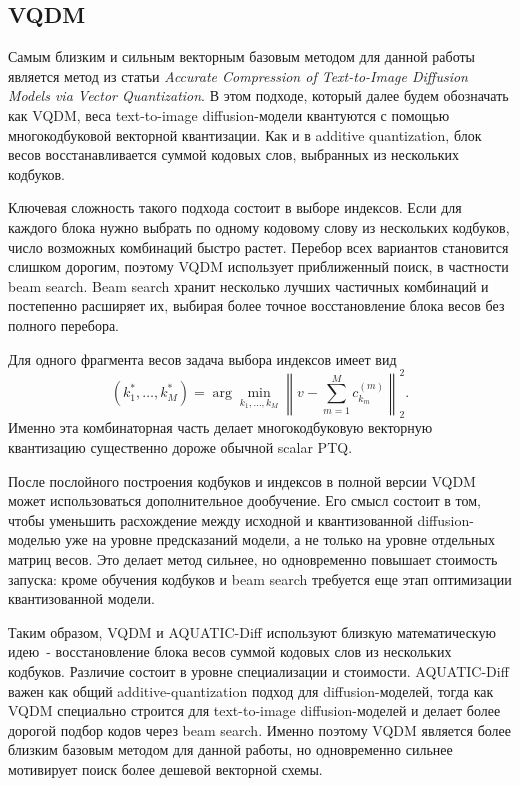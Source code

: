 \documentclass[a4paper,12pt]{article}
\begin{document}
\subsection{VQDM}

Самым близким и сильным векторным базовым методом для данной работы является метод из статьи \textit{Accurate Compression of Text-to-Image Diffusion Models via Vector Quantization}. В этом подходе, который далее будем обозначать как VQDM, веса text-to-image diffusion-модели квантуются с помощью многокодбуковой векторной квантизации. Как и в additive quantization, блок весов восстанавливается суммой кодовых слов, выбранных из нескольких кодбуков.

Ключевая сложность такого подхода состоит в выборе индексов. Если для каждого блока нужно выбрать по одному кодовому слову из нескольких кодбуков, число возможных комбинаций быстро растет. Перебор всех вариантов становится слишком дорогим, поэтому VQDM использует приближенный поиск, в частности beam search. Beam search хранит несколько лучших частичных комбинаций и постепенно расширяет их, выбирая более точное восстановление блока весов без полного перебора.

Для одного фрагмента весов задача выбора индексов имеет вид
\[
    (k_1^*, \ldots, k_M^*)
    =
    \arg\min_{k_1,\ldots,k_M}
    \left\|
        v - \sum_{m=1}^{M} c^{(m)}_{k_m}
    \right\|_2^2.
\]
Именно эта комбинаторная часть делает многокодбуковую векторную квантизацию существенно дороже обычной scalar PTQ.

После послойного построения кодбуков и индексов в полной версии VQDM может использоваться дополнительное дообучение. Его смысл состоит в том, чтобы уменьшить расхождение между исходной и квантизованной diffusion-моделью уже на уровне предсказаний модели, а не только на уровне отдельных матриц весов. Это делает метод сильнее, но одновременно повышает стоимость запуска: кроме обучения кодбуков и beam search требуется еще этап оптимизации квантизованной модели.

Таким образом, VQDM и AQUATIC-Diff используют близкую математическую идею~- восстановление блока весов суммой кодовых слов из нескольких кодбуков. Различие состоит в уровне специализации и стоимости. AQUATIC-Diff важен как общий additive-quantization подход для diffusion-моделей, тогда как VQDM специально строится для text-to-image diffusion-моделей и делает более дорогой подбор кодов через beam search. Именно поэтому VQDM является более близким базовым методом для данной работы, но одновременно сильнее мотивирует поиск более дешевой векторной схемы.
\end{document}
